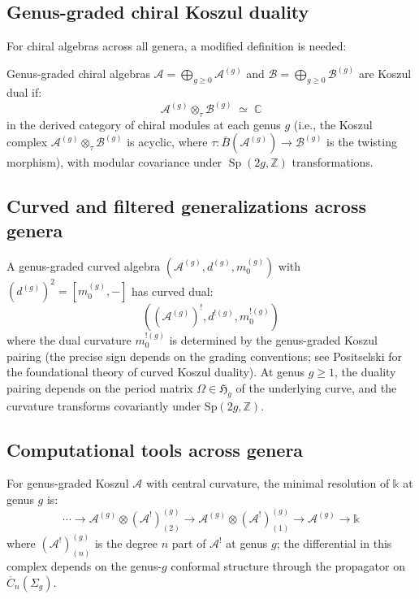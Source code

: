 \subsection{Genus-graded chiral Koszul duality}

For chiral algebras across all genera, a modified definition is needed:

\begin{definition}
Genus-graded chiral algebras $\mathcal{A} = \bigoplus_{g \geq 0} \mathcal{A}^{(g)}$ and $\mathcal{B} = \bigoplus_{g \geq 0} \mathcal{B}^{(g)}$ are Koszul dual if:
\[\mathcal{A}^{(g)} \otimes_\tau \mathcal{B}^{(g)} \;\simeq\; \mathbb{C}\]
in the derived category of chiral modules at each genus $g$ (i.e., the Koszul complex $\mathcal{A}^{(g)} \otimes_\tau \mathcal{B}^{(g)}$ is acyclic, where $\tau: \bar{B}(\mathcal{A}^{(g)}) \to \mathcal{B}^{(g)}$ is the twisting morphism), with modular covariance under $\operatorname{Sp}(2g, \mathbb{Z})$ transformations.
\end{definition}

\subsection{Curved and filtered generalizations across genera}

\begin{definition}
A genus-graded curved algebra $(\mathcal{A}^{(g)}, d^{(g)}, m_0^{(g)})$ with $(d^{(g)})^2 = [m_0^{(g)}, -]$ has curved dual:
\[((\mathcal{A}^{(g)})^!, d^{!(g)}, m_0^{!(g)})\]
where the dual curvature $m_0^{!(g)}$ is determined by the genus-graded Koszul pairing (the precise sign depends on the grading conventions; see Positselski \cite{Positselski11} for the foundational theory of curved Koszul duality).  At genus $g \geq 1$, the duality pairing depends on the period matrix $\Omega \in \mathfrak{H}_g$ of the underlying curve, and the curvature transforms covariantly under $\text{Sp}(2g, \mathbb{Z})$.
\end{definition}

\subsection{Computational tools across genera}

\begin{lemma}
\label{lem:genus-graded-koszul-resolution-appendix}
For genus-graded Koszul $\mathcal{A}$ with central curvature, the minimal resolution of $\mathbb{k}$ at genus $g$ is:
\[\cdots \to \mathcal{A}^{(g)} \otimes (\mathcal{A}^!)_{(2)}^{(g)} \to \mathcal{A}^{(g)} \otimes (\mathcal{A}^!)_{(1)}^{(g)} \to \mathcal{A}^{(g)} \to \mathbb{k}\]
where $(\mathcal{A}^!)_{(n)}^{(g)}$ is the degree $n$ part of $\mathcal{A}^!$ at genus $g$; the differential in this complex depends on the genus-$g$ conformal structure through the propagator on $\overline{C}_n(\Sigma_g)$.
\end{lemma}

